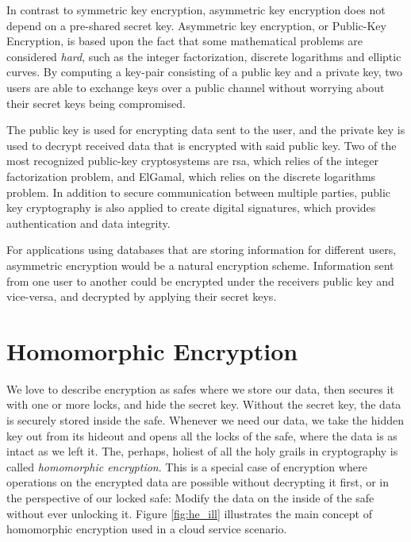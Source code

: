 In contrast to symmetric key encryption, asymmetric key encryption does not depend on a pre-shared secret key. Asymmetric key encryption, or Public-Key Encryption, is based upon the fact that some mathematical problems are considered \emph{hard}, such as the integer factorization, discrete logarithms and elliptic curves. By computing a key-pair consisting of a public key and a private key, two users are able to exchange keys over a public channel without worrying about their secret keys being compromised.

The public key is used for encrypting data sent to the user, and the private key is used to decrypt received data that is encrypted with said public key. Two of the most recognized public-key cryptosystems are \gls{rsa}, which relies of the integer factorization problem, and ElGamal, which relies on the discrete logarithms problem. In addition to secure communication between multiple parties, public key cryptography is also applied to create digital signatures, which provides authentication and data integrity.

For applications using databases that are storing information for different users, asymmetric encryption would be a natural encryption scheme. Information sent from one user to another could be encrypted under the receivers public key and vice-versa, and decrypted by applying their secret keys.


\section{Homomorphic Encryption}

We love to describe encryption as safes where we store our data, then secures it with one or more locks, and hide the secret key. Without the secret key, the data is securely stored inside the safe. Whenever we need our data, we take the hidden key out from its hideout and opens all the locks of the safe, where the data is as intact as we left it. The, perhaps, holiest of all the holy grails in cryptography is called \emph{homomorphic encryption}. This is a special case of encryption where operations on the encrypted data are possible without decrypting it first, or in the perspective of our locked safe: Modify the data on the inside of the safe without ever unlocking it. Figure \ref{fig:he_ill} illustrates the main concept of homomorphic encryption used in a cloud service scenario.

